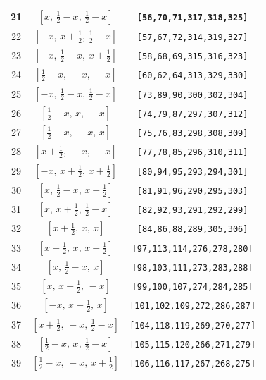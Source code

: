 \documentclass[fleqn,8pt]{jsarticle}
\begin{document}
\begin{longtable}{ccc}
21 & $\left[ x,\, \frac{1}{2} - x,\, \frac{1}{2} - x \right]$ & {\tt [56,70,71,317,318,325]} \\ \hline
22 & $\left[ - x,\, x + \frac{1}{2},\, \frac{1}{2} - x \right]$ & {\tt [57,67,72,314,319,327]} \\ \hline
23 & $\left[ - x,\, \frac{1}{2} - x,\, x + \frac{1}{2} \right]$ & {\tt [58,68,69,315,316,323]} \\ \hline
24 & $\left[ \frac{1}{2} - x,\, - x,\, - x \right]$ & {\tt [60,62,64,313,329,330]} \\ \hline
25 & $\left[ - x,\, \frac{1}{2} - x,\, \frac{1}{2} - x \right]$ & {\tt [73,89,90,300,302,304]} \\ \hline
26 & $\left[ \frac{1}{2} - x,\, x,\, - x \right]$ & {\tt [74,79,87,297,307,312]} \\ \hline
27 & $\left[ \frac{1}{2} - x,\, - x,\, x \right]$ & {\tt [75,76,83,298,308,309]} \\ \hline
28 & $\left[ x + \frac{1}{2},\, - x,\, - x \right]$ & {\tt [77,78,85,296,310,311]} \\ \hline
29 & $\left[ - x,\, x + \frac{1}{2},\, x + \frac{1}{2} \right]$ & {\tt [80,94,95,293,294,301]} \\ \hline
30 & $\left[ x,\, \frac{1}{2} - x,\, x + \frac{1}{2} \right]$ & {\tt [81,91,96,290,295,303]} \\ \hline
31 & $\left[ x,\, x + \frac{1}{2},\, \frac{1}{2} - x \right]$ & {\tt [82,92,93,291,292,299]} \\ \hline
32 & $\left[ x + \frac{1}{2},\, x,\, x \right]$ & {\tt [84,86,88,289,305,306]} \\ \hline
33 & $\left[ x + \frac{1}{2},\, x,\, x + \frac{1}{2} \right]$ & {\tt [97,113,114,276,278,280]} \\ \hline
34 & $\left[ x,\, \frac{1}{2} - x,\, x \right]$ & {\tt [98,103,111,273,283,288]} \\ \hline
35 & $\left[ x,\, x + \frac{1}{2},\, - x \right]$ & {\tt [99,100,107,274,284,285]} \\ \hline
36 & $\left[ - x,\, x + \frac{1}{2},\, x \right]$ & {\tt [101,102,109,272,286,287]} \\ \hline
37 & $\left[ x + \frac{1}{2},\, - x,\, \frac{1}{2} - x \right]$ & {\tt [104,118,119,269,270,277]} \\ \hline
38 & $\left[ \frac{1}{2} - x,\, x,\, \frac{1}{2} - x \right]$ & {\tt [105,115,120,266,271,279]} \\ \hline
39 & $\left[ \frac{1}{2} - x,\, - x,\, x + \frac{1}{2} \right]$ & {\tt [106,116,117,267,268,275]} \\ \hline

\end{longtable}
\end{document}
